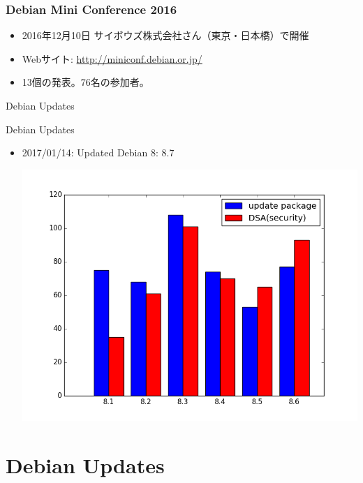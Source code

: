\begin{frame}
 \frametitle{Debian Mini Conference 2016}
 \begin{itemize}
      \item 2016年12月10日 サイボウズ株式会社さん（東京・日本橋）で開催
      \item Webサイト: \url{http://miniconf.debian.or.jp/}
      \item 13個の発表。76名の参加者。
 \end{itemize}
\end{frame}

\begin{frame}\begin{center}\Huge{Debian Updates}\end{center}\end{frame}

\begin{frame}{Debian Updates}
\begin{itemize}[<+->]
\item 2017/01/14: Updated Debian 8: 8.7
 \begin{center}
 \includegraphics[width=0.6\hsize]{image201611/stable-updates.png}
 \end{center}
\end{itemize}

\end{frame}

\section{Debian Updates}

